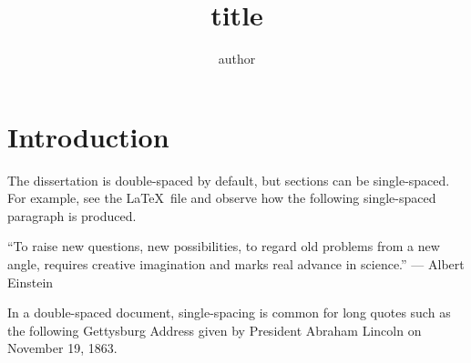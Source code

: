 \documentclass[11pt]{report}
\begin{document}
\title     {title}
\author    {author}





\beginpreface
{}
\endpreface


\chapter{Introduction}

The dissertation is double-spaced by default, but sections can be single-spaced.  For example, see the \LaTeX\ file and observe how the following single-spaced paragraph is produced.

\begin{singlespace}
  ``To raise new questions, new possibilities, to regard old problems from a new angle, requires creative imagination and marks real advance in science.'' --- Albert Einstein
  \end{singlespace}

In a double-spaced document, single-spacing is common for long quotes such as the following Gettysburg Address given by President Abraham Lincoln on November 19, 1863.
\end{document}
